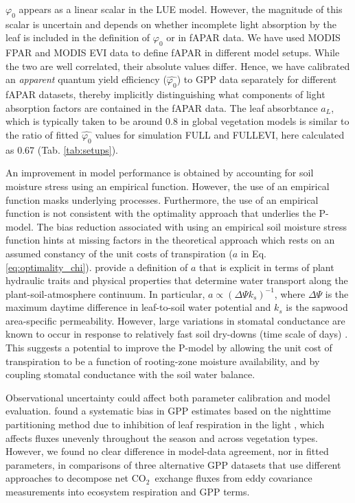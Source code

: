 \documentclass[gmd, manuscript]{copernicus}
\newcommand{\coo}{CO$_2$}
\begin{document}
$\varphi_0$ appears as a linear scalar in the LUE model. However, the magnitude of this scalar is uncertain and depends on whether incomplete light absorption by the leaf is included in the definition of $\varphi_0$ or in fAPAR data. We have used MODIS FPAR and MODIS EVI data to define fAPAR in different model setups.  While the two are well correlated, their absolute values differ. Hence, we have calibrated an \textit{apparent} quantum yield efficiency ($\widehat{\varphi_0}$) to GPP data separately for different fAPAR datasets, thereby implicitly distinguishing what components of light absorption factors are contained in the fAPAR data. The leaf absorbtance $a_L$, which is typically taken to be around 0.8 in global vegetation models \citep{rogers17} is similar to the ratio of fitted $\widehat{\varphi_0}$ values for simulation FULL and FULL\textunderscore EVI, here calculated as 0.67 (Tab. \ref{tab:setups}).

An improvement in model performance is obtained by accounting for soil moisture stress using an empirical function.  However, the use of an empirical function masks underlying processes. Furthermore, the use of an empirical function is not consistent with the optimality approach that underlies the P-model. The bias reduction associated with using an empirical soil moisture stress function hints at missing factors in the theoretical approach which rests on an assumed constancy of the unit costs of transpiration ($a$ in Eq. \ref{eq:optimality_chi}). \citet{prentice14ecollett} provide a definition of $a$ that is explicit in terms of plant hydraulic traits and physical properties that determine water transport along the plant-soil-atmosphere continuum. In particular, $a \propto ( \Delta \Psi k_s )^{-1}$, where $\Delta \Psi$ is the maximum daytime difference in leaf-to-soil water potential and $k_s$ is the sapwood area-specific permeability. However, large variations in stomatal conductance are known to occur in response to relatively fast soil dry-downs (time scale of days) \citep{keenan10agrformet, egea11, stocker18newphyt}. This suggests a potential to improve the P-model by allowing the unit cost of transpiration to be a function of rooting-zone moisture availability, and by coupling stomatal conductance with the soil water balance.

Observational uncertainty could affect both parameter calibration and model evaluation. \citet{keenan19natee} found a systematic bias in GPP estimates based on the nighttime partitioning method due to inhibition of leaf respiration in the light \citep{kok49, wehr16}, which affects fluxes unevenly throughout the season and across vegetation types. However, we found no clear difference in model-data agreement, nor in fitted parameters, in comparisons of three alternative GPP datasets that use different approaches to decompose net \coo\ exchange fluxes from eddy covariance measurements into ecosystem respiration and GPP terms.
\end{document}

